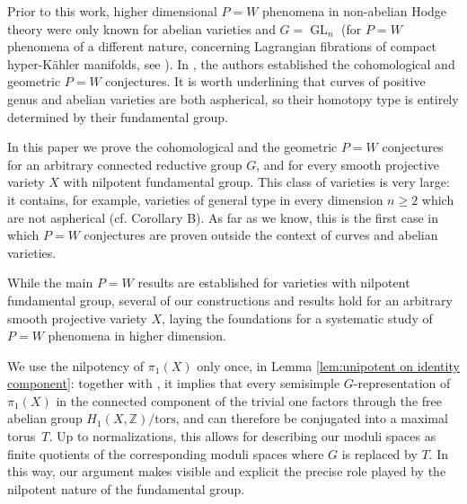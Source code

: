 \documentclass[11pt, a4paper]{amsart}
\theoremstyle{definition}
\theoremstyle{myitemstyle}
\DeclareMathOperator{\GL}{GL}
\begin{document}
Prior to this work, higher dimensional $P=W$ phenomena in non-abelian Hodge theory were only known for abelian varieties and $G=\GL_n$ (for $P=W$ phenomena of a different nature, concerning Lagrangian fibrations of compact hyper-K\"ahler manifolds, see \cite{ShenYin22, HLSY21,FSY22}). In \cite{BKU23}, the authors established the cohomological and geometric $P=W$ conjectures. It is worth underlining that curves of positive genus and abelian varieties are both aspherical, so their homotopy type is entirely determined by their fundamental group.

In this paper we prove the cohomological and the geometric $P=W$ conjectures for an arbitrary connected reductive group $G$, and for every smooth projective variety $X$ with nilpotent fundamental group. 
This class of varieties is very large: it contains, for example, varieties of general type in every dimension $n\geq 2$ which are not aspherical (cf. Corollary B). As far as we know, this is the first case in which $P=W$ conjectures are proven outside the context of curves and abelian varieties. 

While the main $P=W$ results are established for varieties with nilpotent fundamental group, several of our constructions and results hold for an arbitrary smooth projective variety $X$, laying the foundations for a systematic study of $P=W$ phenomena in higher dimension. 

We use the nilpotency of $\pi_1(X)$ only once, in Lemma \ref{lem:unipotent on identity component}: together with , it implies that every semisimple $G$-representation of $\pi_1(X)$ in the connected component of the trivial one factors through the free abelian group $H_1(X,\mathbb{Z})/\mathrm{tors}$, and can therefore be conjugated into a maximal torus~$T$.
Up to normalizations, this allows for describing our moduli spaces as finite quotients of the corresponding moduli spaces where $G$ is replaced by $T$. In this way, our argument makes visible and explicit the precise role played by the nilpotent nature of the fundamental group. 
\end{document}
